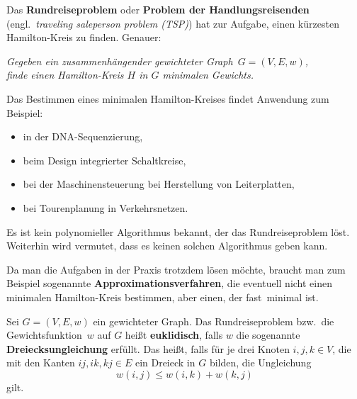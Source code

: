 \begin{bem} 
Das \textbf{Rundreiseproblem} oder \textbf{Problem der Handlungsreisenden} (engl.~\emph{traveling saleperson problem (TSP)}) hat zur Aufgabe, einen kürzesten Hamilton-Kreis zu finden.
Genauer:
\begin{center}
\textit{Gegeben ein zusammenhängender gewichteter Graph~$G=(V,E,w)$,\\ finde einen Hamilton-Kreis $H$ in $G$ minimalen Gewichts.}
\end{center}
Das Bestimmen eines minimalen Hamilton-Kreises findet Anwendung zum Beispiel:
\begin{itemize}
 \item in der DNA-Sequenzierung,
 \item beim Design integrierter Schaltkreise,
 \item bei der Maschinensteuerung bei Herstellung von Leiterplatten,
 \item bei Tourenplanung in Verkehrsnetzen.
\end{itemize}
\end{bem}

\begin{bem}
Es ist kein polynomieller Algorithmus bekannt, der das Rundreiseproblem löst.
Weiterhin wird vermutet, dass es keinen solchen Algorithmus geben kann.

Da man die Aufgaben in der Praxis trotzdem lösen möchte, braucht man zum Beispiel sogenannte \textbf{Approximationsverfahren}, die eventuell nicht einen minimalen Hamilton-Kreis bestimmen, aber einen, der \glqq fast\grqq\ minimal ist.
\end{bem} 

\begin{defn}
Sei $G=(V,E,w)$ ein gewichteter Graph. Das Rundreiseproblem bzw.~die Gewichtsfunktion~$w$ auf $G$ hei\ss t \textbf{euklidisch}, falls $w$ die sogenannte \textbf{Dreiecksungleichung} erfüllt.
Das hei\ss t, falls für je drei Knoten $i,j,k \in V$, die mit den Kanten $ij, ik, kj \in E$ ein Dreieck in $G$ bilden, die Ungleichung
\[
w(i,j) \leq w(i,k) + w(k,j)
\]
gilt.
\end{defn}

